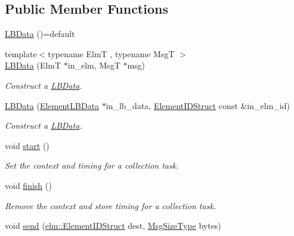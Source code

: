 \subsection*{Public Member Functions}
\begin{DoxyCompactItemize}
\item 
\hyperlink{structvt_1_1ctx_1_1_l_b_data_a2df28bac4813faec6857a0df13692e09}{L\+B\+Data} ()=default
\item 
{\footnotesize template$<$typename ElmT , typename MsgT $>$ }\\\hyperlink{structvt_1_1ctx_1_1_l_b_data_aeee7259db248f19afcc19179c1a623ba}{L\+B\+Data} (ElmT $\ast$in\+\_\+elm, MsgT $\ast$msg)
\begin{DoxyCompactList}\small\item\em Construct a {\ttfamily \hyperlink{structvt_1_1ctx_1_1_l_b_data}{L\+B\+Data}}. \end{DoxyCompactList}\item 
\hyperlink{structvt_1_1ctx_1_1_l_b_data_ac049bfde4cc4820b5e065e1626284b09}{L\+B\+Data} (\hyperlink{structvt_1_1ctx_1_1_l_b_data_a11f1aeb75c01ae0c77d96f94ce1994bb}{Element\+L\+B\+Data} $\ast$in\+\_\+lb\+\_\+data, \hyperlink{structvt_1_1ctx_1_1_l_b_data_aad9fac05c3faf80173b273d900db6fb1}{Element\+I\+D\+Struct} const \&in\+\_\+elm\+\_\+id)
\begin{DoxyCompactList}\small\item\em Construct a {\ttfamily \hyperlink{structvt_1_1ctx_1_1_l_b_data}{L\+B\+Data}}. \end{DoxyCompactList}\item 
void \hyperlink{structvt_1_1ctx_1_1_l_b_data_aa97f2cea343f742b699d49390c481d50}{start} ()
\begin{DoxyCompactList}\small\item\em Set the context and timing for a collection task. \end{DoxyCompactList}\item 
void \hyperlink{structvt_1_1ctx_1_1_l_b_data_ac1d6ac015b90e2a9f577f998175bbc3d}{finish} ()
\begin{DoxyCompactList}\small\item\em Remove the context and store timing for a collection task. \end{DoxyCompactList}\item 
void \hyperlink{structvt_1_1ctx_1_1_l_b_data_a9db5527f7fa49548e4a856ea1caff73a}{send} (\hyperlink{structvt_1_1elm_1_1_element_i_d_struct}{elm\+::\+Element\+I\+D\+Struct} dest, \hyperlink{namespacevt_a408e86a8c7c89309b52907dc5a513924}{Msg\+Size\+Type} bytes)

\end{DoxyCompactItemize}
